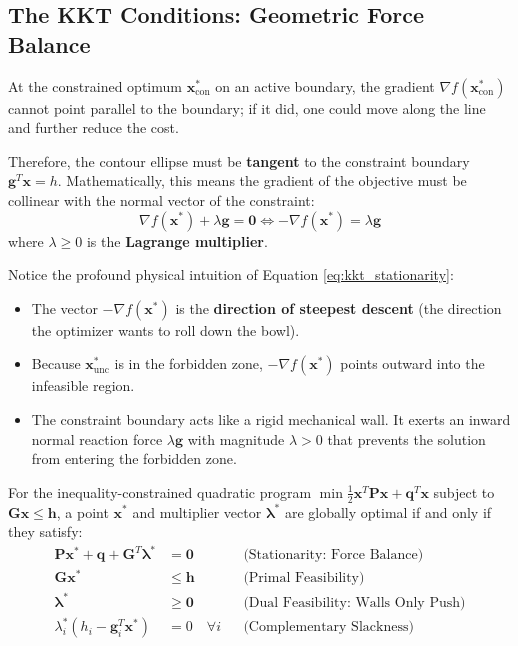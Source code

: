 \documentclass[11pt,a4paper]{article}
\begin{document}
\subsection{The KKT Conditions: Geometric Force Balance}
At the constrained optimum $\mathbf{x}^*_{\mathrm{con}}$ on an active boundary, the gradient $\nabla f(\mathbf{x}^*_{\mathrm{con}})$ cannot point parallel to the boundary; if it did, one could move along the line and further reduce the cost. 

Therefore, the contour ellipse must be \textbf{tangent} to the constraint boundary $\mathbf{g}^T \mathbf{x} = h$. Mathematically, this means the gradient of the objective must be collinear with the normal vector of the constraint:
\begin{equation}
\nabla f(\mathbf{x}^*) + \lambda \mathbf{g} = \mathbf{0} \iff -\nabla f(\mathbf{x}^*) = \lambda \mathbf{g}
\label{eq:kkt_stationarity}
\end{equation}
where $\lambda \ge 0$ is the \textbf{Lagrange multiplier}.

Notice the profound physical intuition of Equation \eqref{eq:kkt_stationarity}:
\begin{itemize}
    \item The vector $-\nabla f(\mathbf{x}^*)$ is the \textbf{direction of steepest descent} (the direction the optimizer wants to roll down the bowl).
    \item Because $\mathbf{x}^*_{\mathrm{unc}}$ is in the forbidden zone, $-\nabla f(\mathbf{x}^*)$ points outward into the infeasible region.
    \item The constraint boundary acts like a rigid mechanical wall. It exerts an inward normal reaction force $\lambda \mathbf{g}$ with magnitude $\lambda > 0$ that prevents the solution from entering the forbidden zone.
\end{itemize}

\begin{definitionbox}
For the inequality-constrained quadratic program $\min \frac{1}{2}\mathbf{x}^T\mathbf{P}\mathbf{x} + \mathbf{q}^T\mathbf{x}$ subject to $\mathbf{G}\mathbf{x} \le \mathbf{h}$, a point $\mathbf{x}^*$ and multiplier vector $\bm{\lambda}^*$ are globally optimal if and only if they satisfy:
\begin{align}
\mathbf{P} \mathbf{x}^* + \mathbf{q} + \mathbf{G}^T \bm{\lambda}^* &= \mathbf{0} && \text{(Stationarity: Force Balance)} \label{eq:kkt_stat} \\
\mathbf{G} \mathbf{x}^* &\le \mathbf{h} && \text{(Primal Feasibility)} \label{eq:kkt_primal} \\
\bm{\lambda}^* &\ge \mathbf{0} && \text{(Dual Feasibility: Walls Only Push)} \label{eq:kkt_dual} \\
\lambda_i^* (h_i - \mathbf{g}_i^T \mathbf{x}^*) &= 0 \quad \forall i && \text{(Complementary Slackness)} \label{eq:kkt_slack}
\end{align}
\end{definitionbox}
\end{document}
